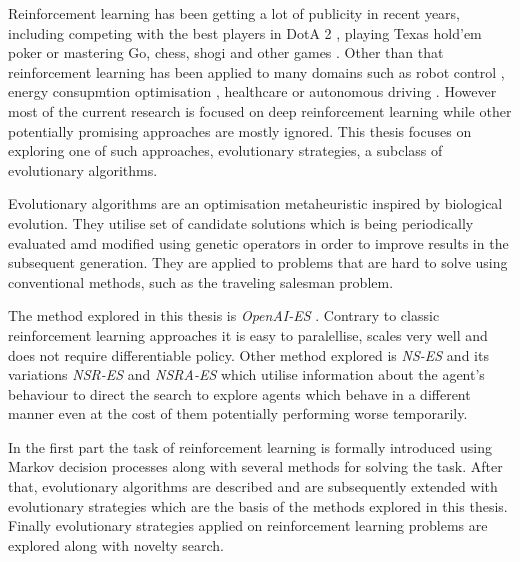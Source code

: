 


Reinforcement learning has been getting a lot of publicity in recent years, including competing with the best players in DotA 2 \cite{openai2019dota}, playing Texas hold'em poker \cite{Brown885} or mastering Go, chess, shogi and other games \cite{Schrittwieser2020}. Other than that reinforcement learning has been applied to many domains such as robot control \cite{openai2019solving}, energy consupmtion optimisation \cite{LISSA2021100043}, healthcare \cite{yu2020reinforcement} or autonomous driving \cite{kiran2021deep}. However most of the current research is focused on deep reinforcement learning while other potentially promising approaches are mostly ignored. This thesis focuses on exploring one of such approaches, evolutionary strategies, a subclass of evolutionary algorithms.

Evolutionary algorithms are an optimisation metaheuristic inspired by biological evolution. They utilise set of candidate solutions which is being periodically evaluated amd modified using genetic operators in order to improve results in the subsequent generation. They are applied to problems that are hard to solve using conventional methods, such as the traveling salesman problem. \cite{Potvin1996}

The method explored in this thesis is \emph{OpenAI-ES} \cite{salimans2017}. Contrary to classic reinforcement learning approaches it is easy to paralellise, scales very well and does not require differentiable policy. Other method explored is \emph{NS-ES} and its variations \emph{NSR-ES} and \emph{NSRA-ES} \cite{conti2018} which utilise information about the agent's behaviour to direct the search to explore agents which behave in a different manner even at the cost of them potentially performing worse temporarily.

In the first part the task of reinforcement learning is formally introduced using Markov decision processes along with several methods for solving the task. After that, evolutionary algorithms are described and are subsequently extended with evolutionary strategies which are the basis of the methods explored in this thesis. Finally evolutionary strategies applied on reinforcement learning problems are explored along with novelty search.